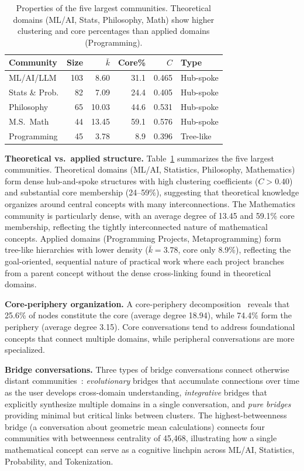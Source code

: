 \documentclass[journal]{IEEEtran}
\begin{document}
\begin{table}[t]
  \centering
  \caption{Properties of the five largest communities.  Theoretical
    domains (ML/AI, Stats, Philosophy, Math) show higher clustering
    and core percentages than applied domains (Programming).}
  \label{tab:communities}
  \small
  \begin{tabular}{@{}lrrrrl@{}}
    \toprule
    \textbf{Community} & \textbf{Size} & $\bar{k}$ & \textbf{Core\%}
      & $C$ & \textbf{Type} \\
    \midrule
    ML/AI/LLM       & 103 & 8.60 & 31.1 & 0.465 & Hub-spoke \\
    Stats \& Prob.   &  82 & 7.09 & 24.4 & 0.405 & Hub-spoke \\
    Philosophy       &  65 & 10.03 & 44.6 & 0.531 & Hub-spoke \\
    M.S.\ Math       &  44 & 13.45 & 59.1 & 0.576 & Hub-spoke \\
    Programming      &  45 &  3.78 &  8.9 & 0.396 & Tree-like \\
    \bottomrule
  \end{tabular}
\end{table}

\textbf{Theoretical vs.\ applied structure.}
Table~\ref{tab:communities} summarizes the five largest communities.
Theoretical domains (ML/AI, Statistics, Philosophy, Mathematics) form
dense hub-and-spoke structures with high clustering coefficients ($C >
0.40$) and substantial core membership (24--59\%), suggesting that
theoretical knowledge organizes around central concepts with many
interconnections.  The Mathematics community is particularly dense, with
an average degree of 13.45 and 59.1\% core membership, reflecting the
tightly interconnected nature of mathematical concepts.  Applied domains
(Programming Projects, Metaprogramming) form tree-like hierarchies with
lower density ($\bar{k} = 3.78$, core only 8.9\%), reflecting the
goal-oriented, sequential nature of practical work where each project
branches from a parent concept without the dense cross-linking found in
theoretical domains.

\textbf{Core-periphery organization.}
A core-periphery decomposition~\cite{borgatti2000models} reveals that
25.6\% of nodes constitute the core (average degree 18.94), while 74.4\%
form the periphery (average degree 3.15).  Core conversations tend to
address foundational concepts that connect multiple domains, while
peripheral conversations are more specialized.

\textbf{Bridge conversations.}
Three types of bridge conversations connect otherwise distant
communities~\cite{towell2025cognitive}: \emph{evolutionary} bridges
that accumulate connections over time as the user develops
cross-domain understanding, \emph{integrative} bridges that
explicitly synthesize multiple domains in a single conversation,
and \emph{pure bridges} providing minimal but critical links between
clusters.  The highest-betweenness bridge (a conversation about
geometric mean calculations) connects four communities with
betweenness centrality of 45,468, illustrating how a single
mathematical concept can serve as a cognitive linchpin across
ML/AI, Statistics, Probability, and Tokenization.
\end{document}

